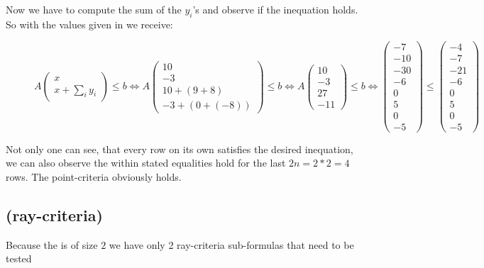 	Now we have to compute the sum of the $y_i$'s and observe if the inequation holds. So with the values given in  we receive:
	\begin{figure}[H]
		\centering
		$A\begin{pmatrix} x \\ x + \sum_i y_i \end{pmatrix} \le b \Leftrightarrow A\begin{pmatrix} 10 \\ -3 \\ 10 + (9+8) \\ -3 + (0+(-8))\end{pmatrix} \le b \Leftrightarrow A\begin{pmatrix} 10 \\ -3 \\ 27 \\ -11 \end{pmatrix} \le b \Leftrightarrow \begin{pmatrix} -7 \\ -10 \\ -30 \\ -6 \\ 0 \\ 5 \\ 0 \\ -5 \end{pmatrix} \le \begin{pmatrix}	-4 \\ -7 \\ -21 \\ -6 \\ 0 \\ 5 \\ 0 \\ -5 \end{pmatrix}$ 
	\end{figure}
	Not only one can see, that every row on its own satisfies the desired inequation, we can also observe the within  stated equalities hold for the last $2n=2*2=4$ rows. The point-criteria obviously holds.

	\newsavebox{\raycrit}%
	\subsection[Verifying: ray-criteria]{(ray-criteria) \usebox{\raycrit}}
	Because the \gna is of size $2$ we have only 2 ray-criteria sub-formulas that need to be tested
